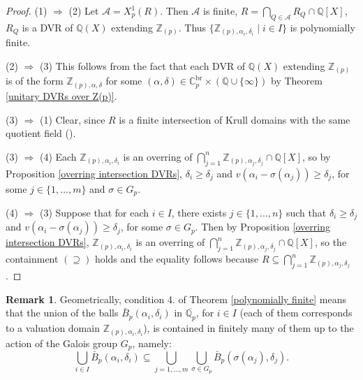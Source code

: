\documentclass[10pt]{article}
\numberwithin{equation}{section}
\theoremstyle{definition}
\newtheorem{Rem}[equation]{Remark}
\theoremstyle{definition}
\newcommand{\Q}{\mathbb{Q}}
\newcommand{\Z}{\mathbb{Z}}
\newcommand{\C}{\mathbb{C}}
\newcommand{\oQp}{\overline{\Q_p}}
\newcommand{\br}{\text{br}}
\begin{document}
\begin{proof}
(1) $\Rightarrow$ (2) Let $\mathcal{A} = X^1_p(R)$. Then $\mathcal{A}$ is finite,
$R = \bigcap\limits_{Q \in \mathcal{A}}R_Q \cap \Q[X]$, $R_Q$ is a DVR of $\Q(X)$ extending $\Z_{(p)}$.
Thus $\{\Z_{(p),\alpha_i,\delta_i} \mid i \in I\}$ is polynomially finite.


(2) $\Rightarrow$ (3) This follows from the fact that each DVR
of $\Q(X)$ extending $\Z_{(p)}$ is of the form $\Z_{(p),\alpha,\delta}$ for some $(\alpha, \delta) \in \C_p^{\br}\times(\Q\cup\{\infty\})$
by Theorem \ref{unitary DVRs over Z(p)}.

(3) $\Rightarrow$ (1) Clear, since $R$ is a finite intersection of Krull domains with the same quotient field (\cite[Chapter VII, \S 1, 3. Exemples, 3)]{Bourb}).

(3) $\Rightarrow$ (4) Each $\Z_{(p),\alpha_i,\delta_i}$ is an overring of $\bigcap\limits_{j=1}^n \Z_{(p),\alpha_j,\delta_j}\cap\Q[X]$, 
so by Proposition \ref{overring intersection DVRs}, $\delta_i\geq\delta_j$ and $v(\alpha_i-\sigma(\alpha_j))\geq \delta_j$, 
for some $j\in\{1,\ldots,m\}$ and $\sigma\in G_p$.

(4) $\Rightarrow$ (3) Suppose that for each $i\in I$, there exists $j\in\{1,\ldots,n\}$ such that $\delta_i\geq\delta_j$ 
and $v(\alpha_i-\sigma(\alpha_j))\geq \delta_j$, for some $\sigma\in G_p$. 
Then by Proposition \ref{overring intersection DVRs}, $\Z_{(p),\alpha_i,\delta_i}$ is an overring of $\bigcap\limits_{j=1}^n \Z_{(p),\alpha_j,\delta_j}\cap\Q[X]$, 
so the containment $(\supseteq)$ holds and the equality follows because $R \subseteq \bigcap\limits_{j=1}^n\Z_{(p), \alpha_j, \delta_j}$.
\end{proof}



\begin{Rem}
Geometrically, condition 4. of Theorem \ref{polynomially finite}
means that the union of the balls $\bar B_p(\alpha_i,\delta_i)$ in $\oQp$, for $i\in I$ (each of them corresponds to a valuation domain $\Z_{(p),\alpha_i,\delta_i}$),  is contained in finitely many of them up to the action of the Galois group $G_p$, namely:
$$\bigcup_{i\in I}\bar B_p(\alpha_i,\delta_i)\subseteq \bigcup_{j=1,\ldots,m}\bigcup_{\sigma\in G_p}\bar B_p(\sigma(\alpha_j),\delta_j).$$
\end{Rem}
\end{document}
